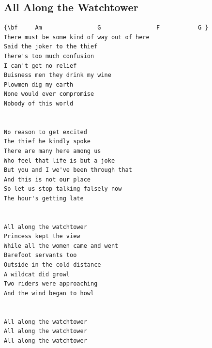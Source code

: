 \documentclass[a4paper]{article}
\begin{document}
\subsection{All Along the Watchtower}
\begin{Verbatim}[commandchars=\\\{\}]
{\bf     Am                G                F           G }
There must be some kind of way out of here
Said the joker to the thief
There's too much confusion
I can't get no relief
Buisness men they drink my wine
Plowmen dig my earth
None would ever compromise
Nobody of this world


No reason to get excited
The thief he kindly spoke
There are many here among us
Who feel that life is but a joke
But you and I we've been through that
And this is not our place
So let us stop talking falsely now
The hour's getting late


All along the watchtower
Princess kept the view
While all the women came and went
Barefoot servants too
Outside in the cold distance
A wildcat did growl
Two riders were approaching
And the wind began to howl


All along the watchtower
All along the watchtower
All along the watchtower

\end{Verbatim}
\newpage
\end{document}
